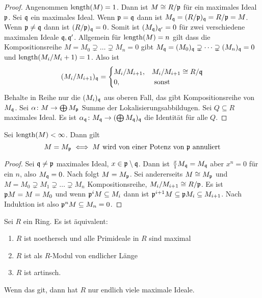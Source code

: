 \begin{proof}
    Angenommen \(\operatorname{length}(M)=1\). Dann ist \(M\cong R/\mathfrak{p}\) für ein maximales Ideal \(\mathfrak{p}\). Sei \(\mathfrak{q}\) ein maximales Ideal. Wenn \(\mathfrak{p}=\mathfrak{q}\) dann ist \(M_{\mathfrak{q}}=(R/\mathfrak{p})_{\mathfrak{q}}=R/\mathfrak{p}=M\).
    Wenn \(\mathfrak{p}\neq\mathfrak{q}\) dann ist \((R/\mathfrak{p})_{\mathfrak{q}}=0\). Somit ist \((M_{\mathfrak{q}})_{\mathfrak{q}'}=0\) für zwei verschiedene maximalen Ideale \(\mathfrak{q},\mathfrak{q}'\).
     Allgemein für \(\operatorname{length}(M)=n\) gilt dass die Kompositionsreihe \(M=M_0\supsetneq \dots\supsetneq M_n=0\) gibt \(M_{\mathfrak{q}}=(M_0)_{\mathfrak{q}}\supsetneq \dots\supsetneq (M_n)_{\mathfrak{q}}=0\) und \(\operatorname{length}(M_i/M_i+1)=1\). Also ist 
      \[(M_i/M_{i+1})_{\mathfrak{q}}=\begin{cases}
        M_i/M_{i+1}, & M_i/M_{i+1}\cong R/\mathfrak{q}\\
        0 , &\text{ sonst}
    \end{cases}\]
    Behalte in Reihe nur die \((M_i)_{\mathfrak{q}}\) aus oberen Fall, das gibt Kompositionsreihe von \(M_{\mathfrak{q}}\).
    Sei \(\alpha\colon M\to \bigoplus M_{\mathfrak{p}}\) Summe der Lokalisierungsabbildugen. Sei \(Q\subseteq R\) maximales Ideal. Es ist \(\alpha_{\mathfrak{q}}\colon M_{\mathfrak{q}}\to (\bigoplus M_{\mathfrak{q}})_{\mathfrak{q}}\) die Identität für alle \(Q\).
\end{proof}
\begin{Satz}
    Sei \(\operatorname{length}(M)<\infty\). Dann gilt
    \[M=M_{\mathfrak{p}}\iff M\text{ wird von einer Potenz von \(\mathfrak{p}\) annuliert}\]
\end{Satz}
\begin{proof}
    Sei \(\mathfrak{q}\neq\mathfrak{p}\) maximales Ideal, \(x\in\mathfrak{p}\setminus\mathfrak{q}\). Dann ist \(\frac x 1 M_{\mathfrak{q}}=M_{\mathfrak{q}}\) aber \(x^n=0\) für ein \(n\), also \(M_{\mathfrak{q}}=0\).
    Nach  folgt \(M=M_{\mathfrak{p}}\).
    Sei andererseits \(M\cong M_{\mathfrak{p}}\) und \(M=M_0\supsetneq M_1\supsetneq \dots \supsetneq M_n\) Kompositionsreihe, \(M_i/M_{i+1}\cong R/\mathfrak{p}\). Es ist \(\mathfrak{p} M=M=M_0\) und wenn \(\mathfrak{p}^iM\subseteq M_i\) dann ist \(\mathfrak{p}^{i+1}M\subseteq \mathfrak{p} M_i\subseteq M_{i+1}\). Nach Induktion ist also \(\mathfrak{p}^nM\subseteq M_n=0\).
\end{proof}
\begin{Satz}\label{Satz:ArtinRingEndlLen}
    Sei \(R\) ein Ring. Es ist äquivalent:
    \begin{enumerate}
        \item \(R\) ist noethersch und alle Primideale in \(R\) sind maximal
        \item \(R\) ist als \(R\)-Modul von endlicher Länge
        \item \(R\) ist artinsch.
    \end{enumerate}
    Wenn das git, dann hat \(R\) nur endlich viele maximale Ideale.
\end{Satz}
